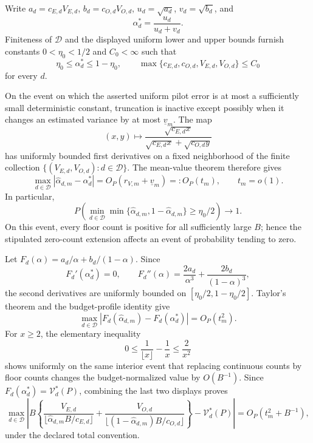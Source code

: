 Write \(a_d=c_{E,d}V_{E,d}\), \(b_d=c_{O,d}V_{O,d}\), \(u_d=\sqrt{a_d}\), \(v_d=\sqrt{b_d}\), and
\[
\alpha_d^*=\frac{u_d}{u_d+v_d}.
\]
Finiteness of \(\mathcal D\) and the displayed uniform lower and upper bounds furnish constants \(0<\eta_0<1/2\) and \(C_0<\infty\) such that
\[
\eta_0\le\alpha_d^*\le1-\eta_0,\qquad
\max\{c_{E,d},c_{O,d},V_{E,d},V_{O,d}\}\le C_0
\]
for every \(d\).

On the event on which the asserted uniform pilot error is at most a sufficiently small deterministic constant, truncation is inactive except possibly when it changes an estimated variance by at most \(\underline v_m\). The map
\[
(x,y)\longmapsto
\frac{\sqrt{c_{E,d}x}}
{\sqrt{c_{E,d}x}+\sqrt{c_{O,d}y}}
\]
has uniformly bounded first derivatives on a fixed neighborhood of the finite collection \(\{(V_{E,d},V_{O,d}):d\in\mathcal D\}\). The mean-value theorem therefore gives
\[
\max_{d\in\mathcal D}|\widehat\alpha_{d,m}-\alpha_d^*|
=O_P(r_{V,m}+\underline v_m)=:O_P(t_m),
\qquad t_m=o(1).
\]
In particular,
\[
P\!\left(\min_{d\in\mathcal D}
\min\{\widehat\alpha_{d,m},1-\widehat\alpha_{d,m}\}
\ge\eta_0/2\right)\longrightarrow1.
\]
On this event, every floor count is positive for all sufficiently large \(B\); hence the stipulated zero-count extension affects an event of probability tending to zero.

Let \(F_d(\alpha)=a_d/\alpha+b_d/(1-\alpha)\). Since
\[
F_d'(\alpha_d^*)=0,\qquad
F_d''(\alpha)=\frac{2a_d}{\alpha^3}+\frac{2b_d}{(1-\alpha)^3},
\]
the second derivatives are uniformly bounded on \([\eta_0/2,1-\eta_0/2]\). Taylor's theorem and the budget-profile identity give
\[
\max_{d\in\mathcal D}
|F_d(\widehat\alpha_{d,m})-F_d(\alpha_d^*)|
=O_P(t_m^2).
\]
For \(x\ge2\), the elementary inequality
\[
0\le\frac1{\lfloor x\rfloor}-\frac1x\le\frac2{x^2}
\]
shows uniformly on the same interior event that replacing continuous counts by floor counts changes the budget-normalized value by \(O(B^{-1})\). Since \(F_d(\alpha_d^*)=\mathcal V_d^*(P)\), combining the last two displays proves
\[
\max_{d\in\mathcal D}\left|B\left\{
\frac{V_{E,d}}{\lfloor\widehat\alpha_{d,m}B/c_{E,d}\rfloor}
+\frac{V_{O,d}}{\lfloor(1-\widehat\alpha_{d,m})B/c_{O,d}\rfloor}
\right\}-\mathcal V_d^*(P)\right|
=O_P(t_m^2+B^{-1}),
\]
under the declared total convention.